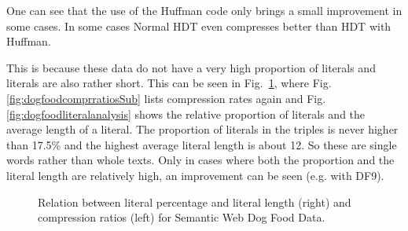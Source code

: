 One can see that the use of the Huffman code only brings a small improvement in some cases. In some cases Normal HDT even compresses better than HDT with Huffman.

This is because these data do not have a very high proportion of literals and literals are also rather short. This can be seen in Fig.~\ref{fig:dogfood}, where Fig.\ref{fig:dogfoodcomprratiosSub} lists compression rates again and Fig.\ref{fig:dogfoodliteralanalysis} shows the relative proportion of literals and the average length of a literal. The proportion of literals in the triples is never higher than 17.5\% and the highest average literal length is about 12. So these are single words rather than whole texts. Only in cases where both the proportion and the literal length are relatively high, an improvement can be seen (e.g. with DF9).


\begin{figure}[h]
	\centering
	\hfill
	\caption{Relation between literal percentage and literal length (right) and compression ratios (left) for Semantic Web Dog Food Data.}
	\label{fig:dogfood}
\end{figure}


